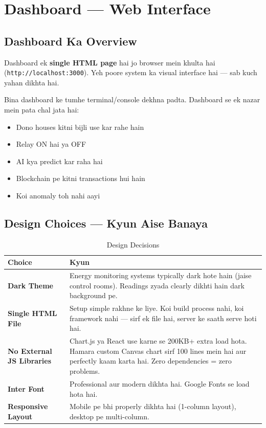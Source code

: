 \chapter{Dashboard --- Web Interface}

\section{Dashboard Ka Overview}

Dashboard ek \textbf{single HTML page} hai jo browser mein khulta hai (\texttt{http://localhost:3000}). Yeh poore system ka visual interface hai --- sab kuch yahan dikhta hai.

\begin{conceptbox}
Bina dashboard ke tumhe terminal/console dekhna padta. Dashboard se ek nazar mein pata chal jata hai:
\begin{itemize}[nosep]
    \item Dono houses kitni bijli use kar rahe hain
    \item Relay ON hai ya OFF
    \item AI kya predict kar raha hai
    \item Blockchain pe kitni transactions hui hain
    \item Koi anomaly toh nahi aayi
\end{itemize}
\end{conceptbox}

\section{Design Choices --- Kyun Aise Banaya}

\begin{table}[H]
\centering
\begin{tabularx}{\textwidth}{l X}
\toprule
\textbf{Choice} & \textbf{Kyun} \\
\midrule
\textbf{Dark Theme} & Energy monitoring systems typically dark hote hain (jaise control rooms). Readings zyada clearly dikhti hain dark background pe. \\
\textbf{Single HTML File} & Setup simple rakhne ke liye. Koi build process nahi, koi framework nahi --- sirf ek file hai, server ke saath serve hoti hai. \\
\textbf{No External JS Libraries} & Chart.js ya React use karne se 200KB+ extra load hota. Hamara custom Canvas chart sirf 100 lines mein hai aur perfectly kaam karta hai. Zero dependencies = zero problems. \\
\textbf{Inter Font} & Professional aur modern dikhta hai. Google Fonts se load hota hai. \\
\textbf{Responsive Layout} & Mobile pe bhi properly dikhta hai (1-column layout), desktop pe multi-column. \\
\bottomrule
\end{tabularx}
\caption{Design Decisions}
\end{table}

